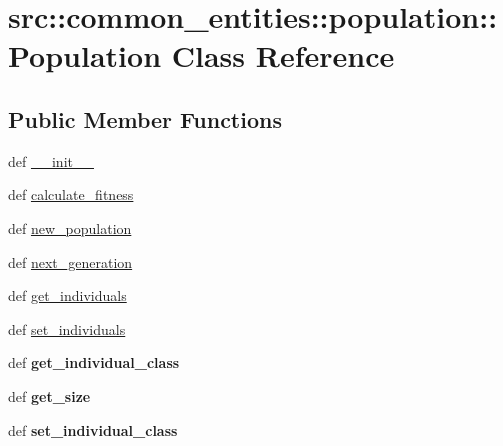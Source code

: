 \hypertarget{classsrc_1_1common__entities_1_1population_1_1Population}{
\section{src::common\_\-entities::population::Population Class Reference}
\label{classsrc_1_1common__entities_1_1population_1_1Population}
}
\subsection*{Public Member Functions}
\begin{DoxyCompactItemize}
\item 
def \hyperlink{classsrc_1_1common__entities_1_1population_1_1Population_a45848619386d083bcf94cf90ceab7b26}{\_\-\_\-init\_\-\_\-}
\item 
def \hyperlink{classsrc_1_1common__entities_1_1population_1_1Population_a6c08c1e222abd3d4218b3578271bf2a8}{calculate\_\-fitness}
\item 
def \hyperlink{classsrc_1_1common__entities_1_1population_1_1Population_a6ac8104359264ec73d194cf3b1cf98a2}{new\_\-population}
\item 
def \hyperlink{classsrc_1_1common__entities_1_1population_1_1Population_a4f65508ba16746e46d940918f8aa627c}{next\_\-generation}
\item 
def \hyperlink{classsrc_1_1common__entities_1_1population_1_1Population_a7fca4206fa8d9e3f29350a201f141424}{get\_\-individuals}
\item 
def \hyperlink{classsrc_1_1common__entities_1_1population_1_1Population_afb228d8168d2d77027c40d06284f2c82}{set\_\-individuals}
\item 
\hypertarget{classsrc_1_1common__entities_1_1population_1_1Population_a599d6c829921a5385c5a4ada5c287169}{
def {\bfseries get\_\-individual\_\-class}}
\label{classsrc_1_1common__entities_1_1population_1_1Population_a599d6c829921a5385c5a4ada5c287169}

\item 
\hypertarget{classsrc_1_1common__entities_1_1population_1_1Population_af46d759d83164c85088dc4a131115fc4}{
def {\bfseries get\_\-size}}
\label{classsrc_1_1common__entities_1_1population_1_1Population_af46d759d83164c85088dc4a131115fc4}

\item 
\hypertarget{classsrc_1_1common__entities_1_1population_1_1Population_a3a23341630c48d2ec1697e7f6e1bef6b}{
def {\bfseries set\_\-individual\_\-class}}
\label{classsrc_1_1common__entities_1_1population_1_1Population_a3a23341630c48d2ec1697e7f6e1bef6b}


\end{DoxyCompactItemize}
